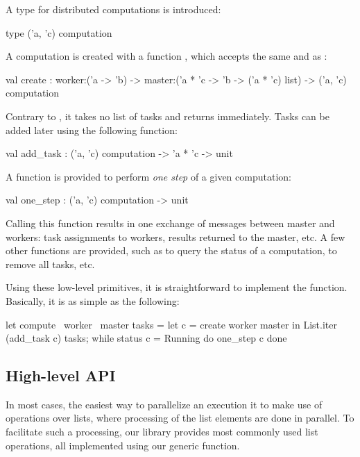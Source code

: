 \documentclass{llncs}
\begin{document}
A type for distributed computations is introduced:
\begin{ocaml}
  type ('a, 'c) computation
\end{ocaml}
A computation is created with a function , which accepts
the same  and  as :
\begin{ocaml}
  val create : 
    worker:('a -> 'b) -> 
    master:('a * 'c -> 'b -> ('a * 'c) list) -> ('a, 'c) computation
\end{ocaml}
Contrary to , it takes no list of tasks and returns
immediately. Tasks can be added later using the following function:
\begin{ocaml}
  val add_task : ('a, 'c) computation -> 'a * 'c -> unit
\end{ocaml}
A function is provided to perform \emph{one step} of a given
computation:
\begin{ocaml}
  val one_step : ('a, 'c) computation -> unit
\end{ocaml}
Calling this function results in one exchange of messages between
master and workers: task assignments to workers, results returned to
the master, etc. A few other functions are provided, such as
 to query the status of a computation,  to remove
all tasks, etc.

Using these low-level primitives, it is straightforward to implement
the  function. Basically, it is as simple as the following:
\begin{ocaml}
let compute ~worker ~master tasks =
  let c = create worker master in
  List.iter (add_task c) tasks;
  while status c = Running do one_step c done
\end{ocaml}


\subsection{High-level API}\label{sec:derived}

In most cases, the easiest way to parallelize an execution it to make
use of operations over lists, where processing of the
list elements are done in parallel. 
To facilitate such a processing,
our library provides most commonly used list operations, all 
implemented using our generic  function.
\end{document}
